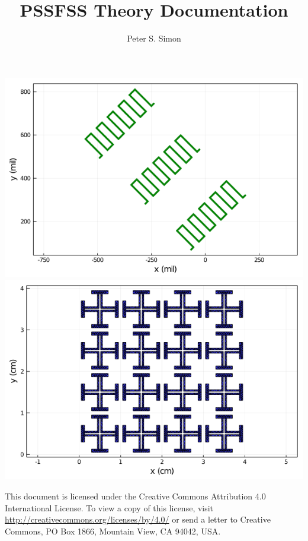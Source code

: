 \documentclass[
letterpaper, %
11pt, %
oneside, 
onecolumn, %
openany, %
]{memoir}
\author{Peter S. Simon}
\title{PSSFSS Theory Documentation}
\numberwithin{equation}{chapter}
\numberwithin{figure}{chapter}
\begin{document}
\renewcommand{\bibname}{References}
\renewcommand{\k}{\boldsymbol{k}}

\frontmatter
\maketitle
\vspace{1.2in}
{\centering
\includegraphics[scale=0.5,trim=150 50 100 20,clip=true]{meanderlines.png} \qquad \quad
\includegraphics[scale=0.5,trim=150 50 100 20,clip=true]{jcrossarray.png}
}

\vspace{1.5in}

This document is licensed under the Creative Commons Attribution 4.0 International License.
To view a copy of this license, visit \url{http://creativecommons.org/licenses/by/4.0/}
or send a letter to Creative Commons, PO Box 1866, Mountain View, CA 94042, USA. 
\end{document}
